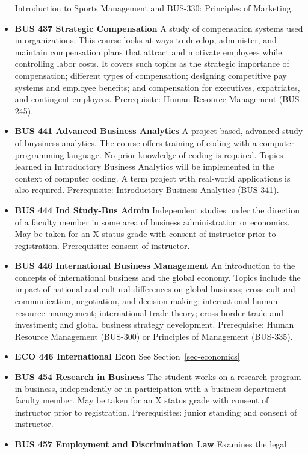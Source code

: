 \documentclass[
  letterpaper,
]{scrbook}
\begin{document}
\begin{itemize}
  Introduction to Sports Management and BUS-330: Principles of
  Marketing.
\item
  \textbf{BUS 437 Strategic Compensation} A study of compensation
  systems used in organizations. This course looks at ways to develop,
  administer, and maintain compensation plans that attract and motivate
  employees while controlling labor costs. It covers such topics as the
  strategic importance of compensation; different types of compensation;
  designing competitive pay systems and employee benefits; and
  compensation for executives, expatriates, and contingent employees.
  Prerequisite: Human Resource Management (BUS-245).
\item
  \textbf{BUS 441 Advanced Business Analytics} A project-based, advanced
  study of buysiness analytics. The course offers training of coding
  with a computer programming language. No prior knowledge of coding is
  required. Topics learned in Introductory Business Analytics will be
  implemented in the context of computer coding. A term project with
  real-world applications is also required. Prerequisite: Introductory
  Business Analytics (BUS 341).
\item
  \textbf{BUS 444 Ind Study-Bus Admin} Independent studies under the
  direction of a faculty member in some area of business administration
  or economics. May be taken for an X status grade with consent of
  instructor prior to registration. Prerequisite: consent of instructor.
\item
  \textbf{BUS 446 International Business Management} An introduction to
  the concepts of international business and the global economy. Topics
  include the impact of national and cultural differences on global
  business; cross-cultural communication, negotiation, and decision
  making; international human resource management; international trade
  theory; cross-border trade and investment; and global business
  strategy development. Prerequisite: Human Resource Management
  (BUS-300) or Principles of Management (BUS-335).
\item
  \textbf{ECO 446 International Econ} See Section~\ref{sec-economics}
\item
  \textbf{BUS 454 Research in Business} The student works on a research
  program in business, independently or in participation with a business
  department faculty member. May be taken for an X status grade with
  consent of instructor prior to registration. Prerequisites: junior
  standing and consent of instructor.
\item
  \textbf{BUS 457 Employment and Discrimination Law} Examines the legal

\end{itemize}
\end{document}
